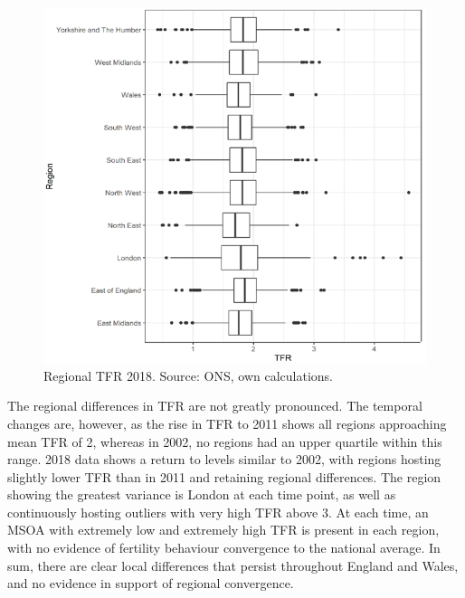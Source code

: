 \documentclass[12pt,twoside]{reedthesis}
\begin{document}
\begin{figure}
\includegraphics[width=0.95\linewidth]{figure/Figure_5c} \caption{Regional TFR 2018. Source: ONS, own calculations.}\label{fig:figure5c}
\end{figure}
The regional differences in TFR are not greatly pronounced. The temporal changes are, however, as the rise in TFR to 2011 shows all regions approaching mean TFR of 2, whereas in 2002, no regions had an upper quartile within this range. 2018 data shows a return to levels similar to 2002, with regions hosting slightly lower TFR than in 2011 and retaining regional differences. The region showing the greatest variance is London at each time point, as well as continuously hosting outliers with very high TFR above 3. At each time, an MSOA with extremely low and extremely high TFR is present in each region, with no evidence of fertility behaviour convergence to the national average. In sum, there are clear local differences that persist throughout England and Wales, and no evidence in support of regional convergence.
\end{document}
